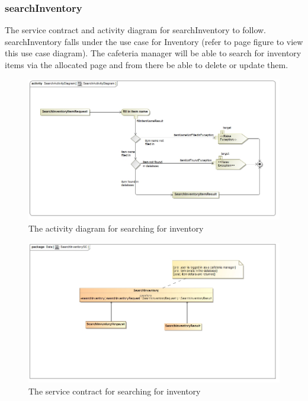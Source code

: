 \documentclass[a4paper,12pt]{article}
\begin{document}
\subsubsection{searchInventory}
The service contract and activity diagram for searchInventory to follow. searchInventory falls under the use case for Inventory (refer to page   figure   to view this use case diagram). The cafeteria manager will be able to search for inventory items via the allocated page and from there be able to delete or update them.
\begin{figure}[H]
  \centering
    \includegraphics[width=1.0\textwidth]{../images/SearchActivityDiagram.jpg}
    \caption{The activity diagram for searching for inventory} 
\end{figure}

\begin{figure}[H]
	\centering
	\includegraphics[width=1.0\textwidth]{../images/SearchInventorySC.jpg}
	\caption{The service contract for searching for inventory}
\end{figure}
\end{document}
